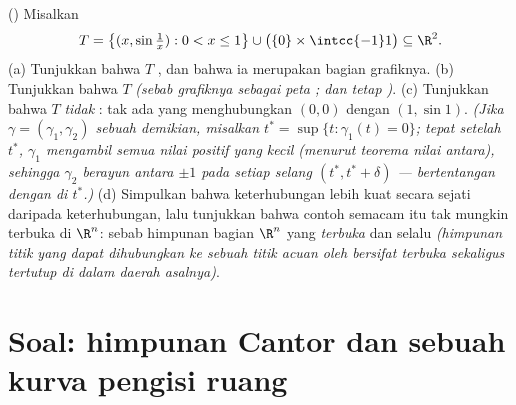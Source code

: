\begin{exercise}[$\star\star\star$]\label{exo:b3:topology:12}
() Misalkan
\[
T = \bigl\{(x, \sin\tfrac1x) : 0 < x \leq 1\bigr\}
\cup \bigl(\{0\}\times\intcc{-1}1\bigr) \subseteq \R^2 .
\]
(a) Tunjukkan bahwa $T$ , dan bahwa ia merupakan 
bagian grafiknya.
(b) Tunjukkan bahwa $T$  \emph{(sebab grafiknya 
sebagai peta ; dan  tetap )}.
(c) Tunjukkan bahwa $T$ \emph{tidak} : tak ada 
 yang menghubungkan $(0,0)$ dengan $(1, \sin1)$. \emph{(Jika $\gamma =
(\gamma_1, \gamma_2)$ sebuah  demikian, misalkan $t^* = \sup\{t :
\gamma_1(t) = 0\}$; tepat setelah $t^*$, $\gamma_1$ mengambil semua
nilai positif yang kecil (menurut teorema nilai antara), sehingga
$\gamma_2$ berayun antara $\pm1$ pada setiap selang
$(t^*, t^* + \delta)$ --- bertentangan dengan  di $t^*$.)}
(d) Simpulkan bahwa keterhubungan  lebih kuat secara sejati
daripada keterhubungan, lalu tunjukkan bahwa contoh semacam itu tak mungkin
terbuka di $\R^n$: sebab himpunan bagian $\R^n$ yang \emph{terbuka} dan  selalu
 \emph{(himpunan titik yang dapat dihubungkan ke sebuah titik
acuan oleh  bersifat terbuka sekaligus tertutup di dalam daerah asalnya)}.
\end{exercise}

\section{Soal: himpunan Cantor dan sebuah kurva pengisi ruang}


